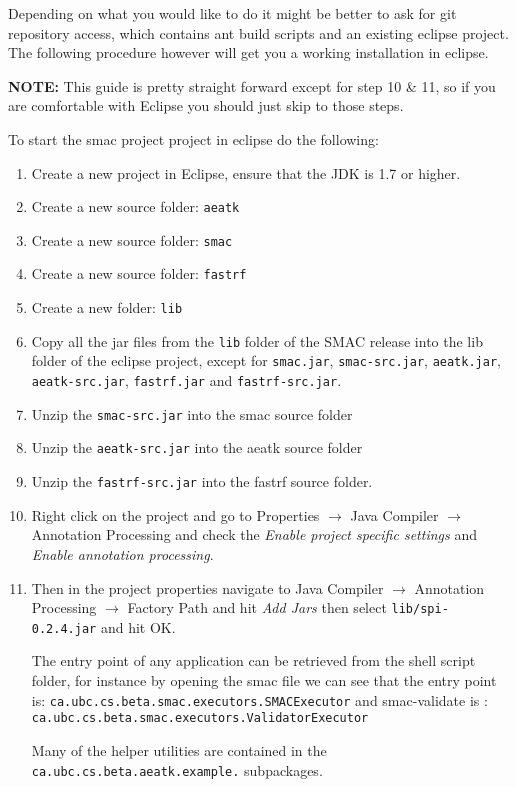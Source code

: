 \documentclass[manual.tex]{subfiles}
\begin{document}
Depending on what you would like to do it might be better to ask for git repository access, which contains ant build scripts and an existing eclipse project. The following procedure however will get you a working installation in eclipse. 

\textbf{NOTE:} This guide is pretty straight forward except for step 10 \& 11, so if you are comfortable with Eclipse you should just skip to those steps.

To start the smac project project in eclipse do the following:
\begin{enumerate}

\item Create a new project in Eclipse, ensure that the JDK is 1.7 or higher.

\item Create a new source folder: \texttt{aeatk}

\item Create a new source folder: \texttt{smac}

\item Create a new source folder: \texttt{fastrf}

\item Create a new folder: \texttt{lib}

\item Copy all the jar files from the \texttt{lib} folder of the SMAC release into the lib folder of the eclipse project, except for \texttt{smac.jar}, \texttt{smac-src.jar}, \texttt{aeatk.jar}, \texttt{aeatk-src.jar}, \texttt{fastrf.jar} and \texttt{fastrf-src.jar}.

\item Unzip the \texttt{smac-src.jar} into the smac source folder

\item Unzip the \texttt{aeatk-src.jar} into the aeatk source folder

\item Unzip the \texttt{fastrf-src.jar} into the fastrf source folder.

\item Right click on the project and go to Properties $\rightarrow$ Java Compiler $\rightarrow$ Annotation Processing and check the \emph{Enable project specific settings} and \emph{Enable annotation processing}.

\item Then in the project properties navigate to Java Compiler $\rightarrow$ Annotation Processing $\rightarrow$ Factory Path and hit \emph{Add Jars} then select \texttt{lib/spi-0.2.4.jar} and hit OK.

The entry point of any application can be retrieved from the shell script folder, for instance by opening the smac file we can see that the entry point is: \texttt{ca.ubc.cs.beta.smac.executors.SMACExecutor} and smac-validate is : \texttt{ca.ubc.cs.beta.smac.executors.ValidatorExecutor}

Many of the helper utilities are contained in the \texttt{ca.ubc.cs.beta.aeatk.example.} subpackages.

\end{enumerate}
\end{document}

